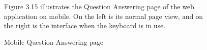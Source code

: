 \documentclass[12pt,oneside,openright,a4paper]{cpe-english-project}
\begin{document}
\begin{figure}[!h]
\begin{minipage}{.3\textwidth}
      \end{minipage}%
      \caption{Mobile Question Answering page}\label{fig:Mobile Question Answering page}
      \begin{flushleft}
        \qquad Figure 3.15 illustrates the Question Answering page of the web application on mobile. On the left is its normal page view, and on the right is the interface when the keyboard is in use. \par
      \end{flushleft}
    \end{figure}
\newpage
\end{document}
